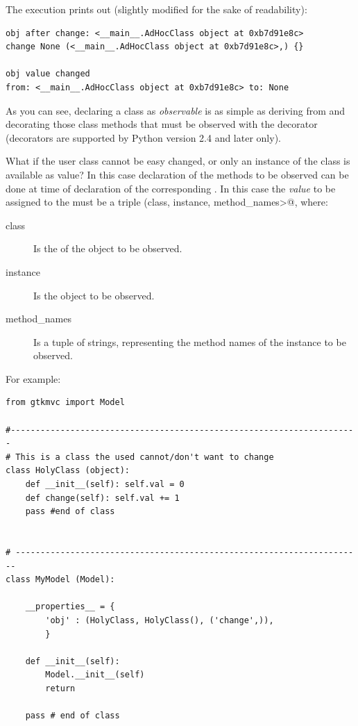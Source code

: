 The execution prints out (slightly modified for the sake of
readability):

{ \codesize 
\begin{verbatim} 
obj after change: <__main__.AdHocClass object at 0xb7d91e8c> 
change None (<__main__.AdHocClass object at 0xb7d91e8c>,) {}

obj value changed 
from: <__main__.AdHocClass object at 0xb7d91e8c> to: None
\end{verbatim}
}

As you can see, declaring a class as \emph{observable} is as simple as
deriving from  and decorating
those class methods that must be observed with the decorator 
 (decorators are supported by
Python version 2.4 and later only). 

\vspace{4mm}
What if the user class cannot be easy changed, or only an instance of
the class is available as \OP value? In this case declaration of the
methods to be observed can be done at time of declaration of the
corresponding \OP. In this case the \emph{value} to be assigned to the
\OP must be a triple \verb@(class, instance, method_names>@, where:
\begin{description}
\item[class] Is the  of the object to be observed.
\item[instance] Is the object to be observed.
\item[method\_names] Is a tuple of strings, representing the method
  names of the instance to be observed.
\end{description}

For example:
{ \codesize 
\begin{verbatim} 
from gtkmvc import Model

#----------------------------------------------------------------------
# This is a class the used cannot/don't want to change
class HolyClass (object):    
    def __init__(self): self.val = 0 
    def change(self): self.val += 1
    pass #end of class


# ----------------------------------------------------------------------
class MyModel (Model):

    __properties__ = {
        'obj' : (HolyClass, HolyClass(), ('change',)),
        }

    def __init__(self):
        Model.__init__(self)
        return    

    pass # end of class
\end{verbatim}
}




